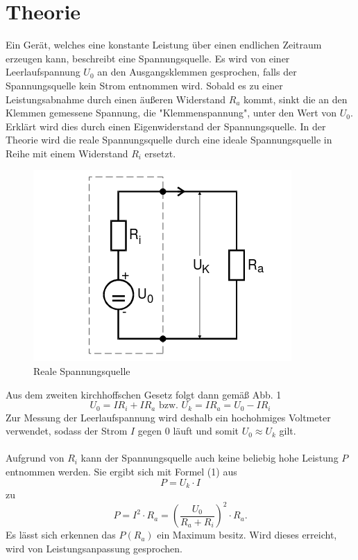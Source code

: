 \section{Theorie}
\label{sec:Theorie}

Ein Gerät, welches eine konstante Leistung über
einen endlichen Zeitraum erzeugen kann, beschreibt eine Spannungsquelle. Es wird von einer Leerlaufspannung $ U_0 $
an den Ausgangsklemmen gesprochen, falls der Spannungsquelle kein Strom entnommen wird.
Sobald es zu einer Leistungsabnahme durch einen äußeren Widerstand $ R_a $ kommt,
sinkt die an den Klemmen gemessene Spannung, die "Klemmenspannung", unter den Wert von $ U_0 $. Erklärt wird
dies durch einen Eigenwiderstand der Spannungsquelle. In der Theorie wird die reale
Spannungsquelle durch eine ideale Spannungsquelle in Reihe mit einem Widerstand $ R_i$
ersetzt.
\begin{figure}[H]
  \centering

  \includegraphics[width=\linewidth-200pt,height=\textheight-200pt,keepaspectratio]{content/Spannungsquelle1.png}
  \caption{Reale Spannungsquelle}
  \label{fig:Spannung1}
\end{figure}

Aus dem zweiten kirchhoffschen Gesetz folgt dann gemäß Abb. 1
\begin{equation}
	 U_0 = I R_i + I R_a  \text{ bzw. } U_k = I R_a = U_0-IR_i
\end{equation}
Zur Messung der Leerlaufspannung wird deshalb ein hochohmiges Voltmeter verwendet,
sodass der Strom $I$ gegen $0$ läuft und somit $U_0 \approx U_k$ gilt.\\
\\
Aufgrund von $R_i$ kann der Spannungsquelle auch keine beliebig hohe Leistung $P$
entnommen werden. Sie ergibt sich mit Formel (1) aus
\begin{equation}
	P = U_k \cdot I
\end{equation}
zu
\begin{equation}
P = I^2 \cdot R_a = \left(\frac{U_0}{R_a+R_i}\right)^2 \cdot R_a\text{.}
\end{equation}
Es lässt sich erkennen das $P(R_a)$ ein Maximum besitz. Wird dieses erreicht, wird von Leistungsanpassung gesprochen.

